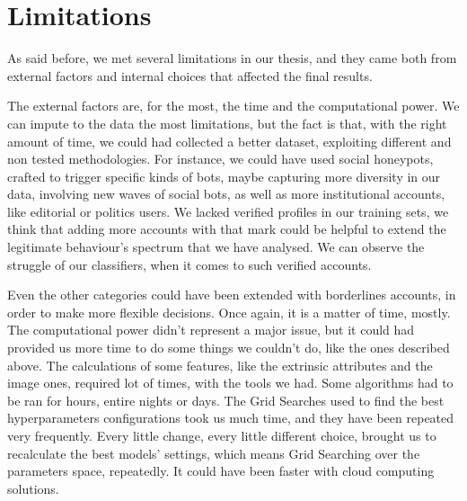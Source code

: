 \section{Limitations}
As said before, we met several limitations in our thesis, and they came both from external factors and internal choices that affected the final results.

The external factors are, for the most, the time and the computational power.
We can impute to the data the most limitations, but the fact is that, with the right amount of time, we could had collected a better dataset, exploiting different and non tested methodologies. For instance, we could have used social honeypots, crafted to trigger specific kinds of bots, maybe capturing more diversity in our data, involving new waves of social bots, as well as more institutional accounts, like editorial or politics users. We lacked verified profiles in our training sets, we think that adding more accounts with that mark could be helpful to extend the legitimate behaviour's spectrum that we have analysed. We can observe the struggle of our classifiers, when it comes to such verified accounts.

Even the other categories could have been extended with borderlines accounts, in order to make more flexible decisions. Once again, it is a matter of time, mostly.
The computational power didn't represent a major issue, but it could had provided us more time to do some things we couldn't do, like the ones described above.
The calculations of some features, like the extrinsic attributes and the image ones, required lot of times, with the tools we had. Some algorithms had to be ran for hours, entire nights or days. The Grid Searches used to find the best hyperparameters configurations took us much time, and they have been repeated very frequently. Every little change, every little different choice, brought us to recalculate the best models' settings, which means Grid Searching over the parameters space, repeatedly.
It could have been faster with cloud computing solutions.


